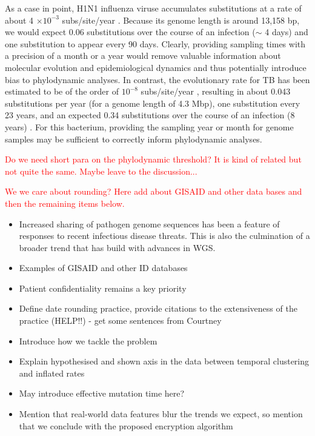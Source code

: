 \documentclass{article}
\begin{document}
\begin{spacing}{1.5}
As a case in point, H1N1 influenza viruse accumulates substitutions at a rate of about 4 $\times10^{-3}$ subs/site/year \citep{hedge_2013_real-time}. Because its genome length is around 13,158 bp, we would expect 0.06 substitutions over the course of an infection ($\sim$ 4 days) and one substitution to appear every 90 days. Clearly, providing sampling times with a precision of a month or a year would remove valuable information about molecular evolution and epidemiological dynamics and thus potentially introduce bias to phylodynamic analyses. In contrast, the evolutionary rate for TB has been estimated to be of the order of $10^{-8}$ subs/site/year \citep{menardo2019molecular}, resulting in about 0.043 substitutions per year (for a genome length of 4.3 Mbp), one substitution every 23 years, and an expected 0.34 substitutions over the course of an infection (8 years) \citep{kuhnert_tuberculosis_2018}. For this bacterium, providing the sampling year or month for genome samples may be sufficient to correctly inform phylodynamic analyses.

\textcolor{red}{Do we need short para on the phylodynamic threshold? It is kind of related but not quite the same. Maybe leave to the discussion...}

\textcolor{red}{We we care about rounding? Here add about GISAID and other data bases and then the remaining items below. }


\begin{itemize}
    \item Increased sharing of pathogen genome sequences has been a feature of responses to recent infectious disease threats. This is also the culmination of a broader trend that has build with advances in WGS. 
    \item Examples of GISAID and other ID databases
    \item Patient confidentiality remains a key priority 
    \item Define date rounding practice, provide citations to the extensiveness of the practice (HELP!!) - get some sentences from Courtney
    \item Introduce how we tackle the problem
    \item Explain hypothesised and shown axis in the data between temporal clustering and inflated rates
    \item May introduce effective mutation time here?
    \item Mention that real-world data features blur the trends we expect, so mention that we conclude with the proposed encryption algorithm
\end{itemize}




\end{spacing}
\end{document}
